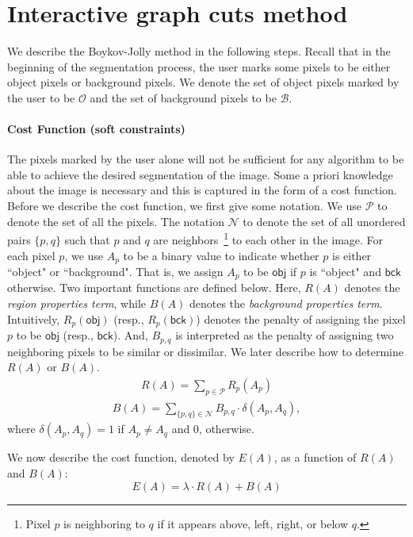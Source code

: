 \documentclass{acm}
\newcommand{\setpixels}{\mathcal{P}}
\newcommand{\setobj}{\mathcal{O}}
\newcommand{\setbck}{\mathcal{B}}
\newcommand{\obj}{\mathsf{obj}}
\newcommand{\background}{\mathsf{bck}}
\newcommand{\setneighbors}{\mathcal{N}}
\begin{document}
\section{Interactive graph cuts method}
\label{sec:graphcuts}
\noindent We describe the Boykov-Jolly method in the following steps. Recall that in the beginning of the segmentation process, the user marks some pixels to be either object pixels or background pixels. We denote the set of object pixels marked by the user to be $\setobj$ and the set of background pixels to be $\setbck$. 

\paragraph{Cost Function (soft constraints)} The pixels marked by the user alone will not be sufficient for any algorithm to be able to achieve the desired segmentation of the image. Some a priori knowledge about the image is necessary and this is captured in the form of a cost function. Before we describe the cost function, we first give some notation. We use $\setpixels$ to denote the set of all the pixels. The notation $\setneighbors$ to denote the set of all unordered pairs $\{p,q\}$ such that $p$ and $q$ are neighbors~\footnote{Pixel $p$ is neighboring to $q$ if it appears above, left, right, or below $q$. } to each other in the image. For each pixel $p$, we use $A_p$ to be a binary value to indicate whether $p$ is either ``object" or ``background". That is, we assign $A_p$ to be $\obj$ if  $p$ is ``object" and $\background$ otherwise. Two important functions are defined below. Here, $R(A)$ denotes the \textit{region properties term}, while $B(A)$ denotes the \textit{background properties term}. Intuitively, $R_p(\obj)$ (resp., $R_p(\background)$) denotes the penalty of assigning the pixel $p$ to be $\obj$ (resp., $\background$). And, $B_{p,q}$ is interpreted as the penalty of assigning two neighboring pixels to be similar or dissimilar. We later describe how to determine $R(A)$ or $B(A)$.  
\begin{align}
R(A) = \sum\limits_{p \in \setpixels} R_p(A_p) 
\end{align}
\begin{align}
B(A) = \sum\limits_{\{p,q\} \in \setneighbors} B_{p,q} \cdot \delta(A_{p},A_{q}),
\end{align}
where $\delta(A_p,A_q)=1$ if $A_p \neq A_q$ and 0, otherwise. 
\par We now describe the cost function, denoted by $E(A)$, as a function of $R(A)$ and $B(A)$: 
$$E(A)= \lambda \cdot R(A) + B(A) $$
\end{document}
